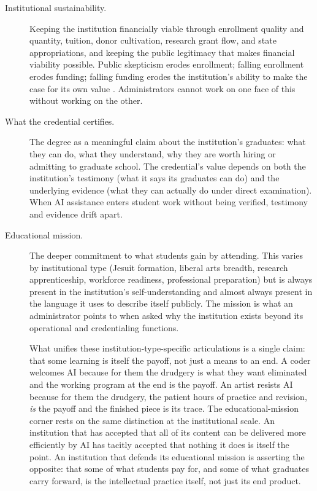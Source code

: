 \documentclass{SIAMbook2023}
\begin{document}
\begin{description}
\item[Institutional sustainability.] Keeping the institution financially viable through enrollment quality and quantity, tuition, donor cultivation, research grant flow, and state appropriations, and keeping the public legitimacy that makes financial viability possible. Public skepticism erodes enrollment; falling enrollment erodes funding; falling funding erodes the institution's ability to make the case for its own value \citep{insidehighered2026presidents}. Administrators cannot work on one face of this without working on the other.

\item[What the credential certifies.] The degree as a meaningful claim about the institution's graduates: what they can do, what they understand, why they are worth hiring or admitting to graduate school. The credential's value depends on both the institution's testimony (what it says its graduates can do) and the underlying evidence (what they can actually do under direct examination). When AI assistance enters student work without being verified, testimony and evidence drift apart.

\item[Educational mission.] The deeper commitment to what students gain by attending. This varies by institutional type (Jesuit formation, liberal arts breadth, research apprenticeship, workforce readiness, professional preparation) but is always present in the institution's self-understanding and almost always present in the language it uses to describe itself publicly. The mission is what an administrator points to when asked why the institution exists beyond its operational and credentialing functions.

What unifies these institution-type-specific articulations is a single claim: that some learning is itself the payoff, not just a means to an end. A coder welcomes AI because for them the drudgery is what they want eliminated and the working program at the end is the payoff. An artist resists AI because for them the drudgery, the patient hours of practice and revision, \emph{is} the payoff and the finished piece is its trace. The educational-mission corner rests on the same distinction at the institutional scale. An institution that has accepted that all of its content can be delivered more efficiently by AI has tacitly accepted that nothing it does is itself the point. An institution that defends its educational mission is asserting the opposite: that some of what students pay for, and some of what graduates carry forward, is the intellectual practice itself, not just its end product.
\end{description}
\end{document}
